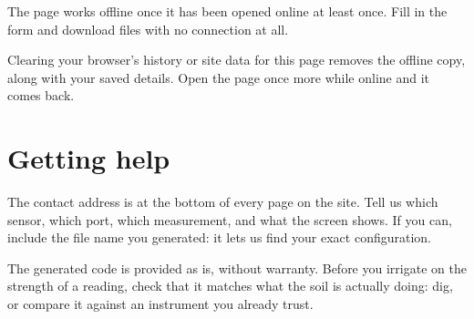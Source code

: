\documentclass[11pt,a4paper]{article}
\begin{document}
The page works offline once it has been opened online at least once. Fill in
the form and download files with no connection at all.

Clearing your browser's history or site data for this page removes the offline
copy, along with your saved details. Open the page once more while online and
it comes back.

\section{Getting help}

The contact address is at the bottom of every page on the site. Tell us which
sensor, which port, which measurement, and what the screen shows. If you can,
include the file name you generated: it lets us find your exact configuration.

\vfill
\begin{center}
\small The generated code is provided as is, without warranty. Before you
irrigate on the strength of a reading, check that it matches what the soil is
actually doing: dig, or compare it against an instrument you already trust.
\end{center}
\end{document}
